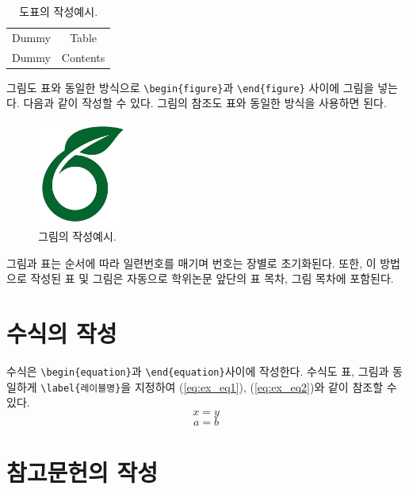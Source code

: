 \documentclass[ko]{UOSThesis}
\begin{document}
\begin{table}[h]
    \centering
    \caption{도표의 작성예시.}
    \begin{tabular}{cc}
    \toprule
        Dummy & Table \\
        Dummy & Contents \\
    \bottomrule
    \end{tabular}
    \label{tab:ex_table1}
\end{table}

그림도 표와 동일한 방식으로 \texttt{\textbackslash begin\{figure\}}과 \texttt{\textbackslash end\{figure\}} 사이에 그림을 넣는다. 다음과 같이 작성할 수 있다. 그림의 참조도 표와 동일한 방식을 사용하면 된다.

\begin{figure}[h]
    \centering
    \includegraphics[width=3cm]{figs/overleaf.png}
    \caption{그림의 작성예시.}
    \label{fig:ex_figure1}
\end{figure}

그림과 표는 순서에 따라 일련번호를 매기며 번호는 장별로 초기화된다. 또한, 이 방법으로 작성된 표 및 그림은 자동으로 학위논문 앞단의 표 목차, 그림 목차에 포함된다.

\chapter{수식의 작성}

수식은 \texttt{\textbackslash begin\{equation\}}과 \texttt{\textbackslash end\{equation\}}사이에 작성한다. 수식도 표, 그림과 동일하게 \texttt{\textbackslash label\{레이블명\}}을 지정하여 (\ref{eq:ex_eq1}), (\ref{eq:ex_eq2})와 같이 참조할 수 있다.
\begin{equation}
    x = y
    \label{eq:ex_eq1}
\end{equation}
\begin{equation}
    a = b
    \label{eq:ex_eq2}
\end{equation}

\chapter{참고문헌의 작성}
\end{document}
